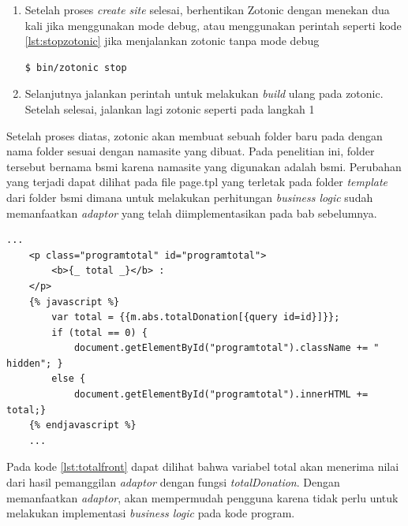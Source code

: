 \begin{enumerate}
	\item Setelah proses \textit{create site} selesai, berhentikan Zotonic dengan menekan  dua kali jika menggunakan mode debug, atau menggunakan perintah seperti kode \ref{lst:stopzotonic} jika menjalankan zotonic tanpa mode debug
	\begin{minipage}{\linewidth}
		\begin{lstlisting}[caption={Perintah untuk memberhentikan zotonic},label={lst:stopzotonic}]
		$ bin/zotonic stop
		\end{lstlisting}
	\end{minipage}

	\item Selanjutnya jalankan perintah  untuk melakukan \textit{build} ulang pada zotonic. Setelah selesai, jalankan lagi zotonic seperti pada langkah 1
	
\end{enumerate}

Setelah proses diatas, zotonic akan membuat sebuah folder baru pada  dengan nama folder sesuai dengan namasite yang dibuat. Pada penelitian ini, folder tersebut bernama bsmi karena namasite yang digunakan adalah bsmi. Perubahan yang terjadi dapat dilihat pada file page.tpl yang terletak pada folder \textit{template} dari folder bsmi dimana untuk melakukan perhitungan \textit{business logic} sudah memanfaatkan \textit{adaptor} yang telah diimplementasikan pada bab sebelumnya.
\begin{minipage}{\linewidth}
	\begin{lstlisting}[caption={\textit{Business logic} untuk fungsi total pada kategori program},label={lst:totalfront}]
	...
	<p class="programtotal" id="programtotal">
		<b>{_ total _}</b> : 
	</p>
	{% javascript %} 
		var total = {{m.abs.totalDonation[{query id=id}]}}; 
		if (total == 0) {
			document.getElementById("programtotal").className += " hidden"; } 
		else { 
			document.getElementById("programtotal").innerHTML += total;}
	{% endjavascript %}
	...
	\end{lstlisting}
\end{minipage}

Pada kode \ref{lst:totalfront} dapat dilihat bahwa variabel total akan menerima nilai dari hasil pemanggilan \textit{adaptor} dengan fungsi \textit{totalDonation}. Dengan memanfaatkan \textit{adaptor}, akan mempermudah pengguna karena tidak perlu untuk melakukan implementasi \textit{business logic} pada kode program.
